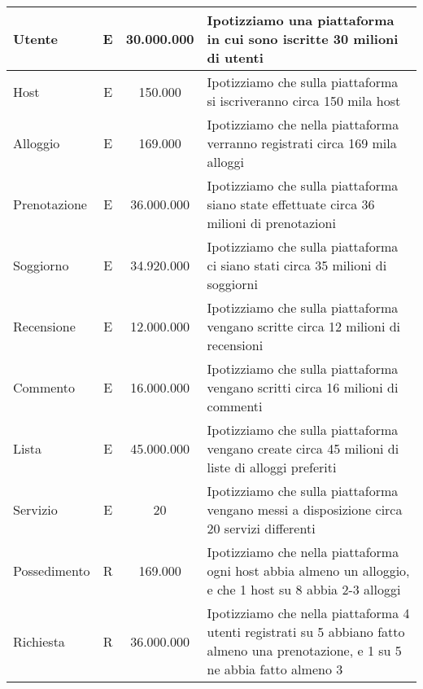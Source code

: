 \begin{longtable}{|l|c|c|p{6.2cm}|}
    \hline
    \endlastfoot
    Utente                   & E             & 30.000.000      & {Ipotizziamo una piattaforma in cui sono iscritte 30 milioni di utenti}
    \\\hline
    Host                     & E             & 150.000         & {Ipotizziamo che sulla piattaforma si iscriveranno circa 150 mila host}
    \\\hline
    Alloggio                 & E             & 169.000         & {Ipotizziamo che nella piattaforma verranno registrati circa 169 mila alloggi}                                                                    \\\hline
    Prenotazione             & E             & 36.000.000      & {Ipotizziamo che sulla piattaforma siano state effettuate circa 36 milioni di prenotazioni}                                                               \\\hline
    Soggiorno                & E             & 34.920.000      & {Ipotizziamo che sulla piattaforma ci siano stati circa 35 milioni di soggiorni}                                                                  \\\hline
    Recensione               & E             & 12.000.000      & {Ipotizziamo che sulla piattaforma vengano scritte circa 12 milioni di recensioni}                                                                 \\\hline
    Commento                 & E             & 16.000.000      & {Ipotizziamo che sulla piattaforma vengano scritti circa 16 milioni di commenti}                                                                   \\\hline
    Lista                    & E             & 45.000.000      & {Ipotizziamo che sulla piattaforma vengano create circa 45 milioni di liste di alloggi preferiti}                                                                  \\\hline
    Servizio                 & E             & 20              & {Ipotizziamo che sulla piattaforma vengano messi a disposizione circa 20 servizi differenti}                                                                 \\\hline
    Possedimento             & R             & 169.000         & {Ipotizziamo che nella piattaforma ogni host abbia almeno un alloggio, e che 1 host su 8 abbia 2-3 alloggi}                                                                    \\\hline
    Richiesta                & R             & 36.000.000      & {Ipotizziamo che nella piattaforma 4 utenti registrati su 5 abbiano fatto almeno una prenotazione, e 1 su 5 ne abbia fatto almeno 3}                                                    \\\hline

\end{longtable}
